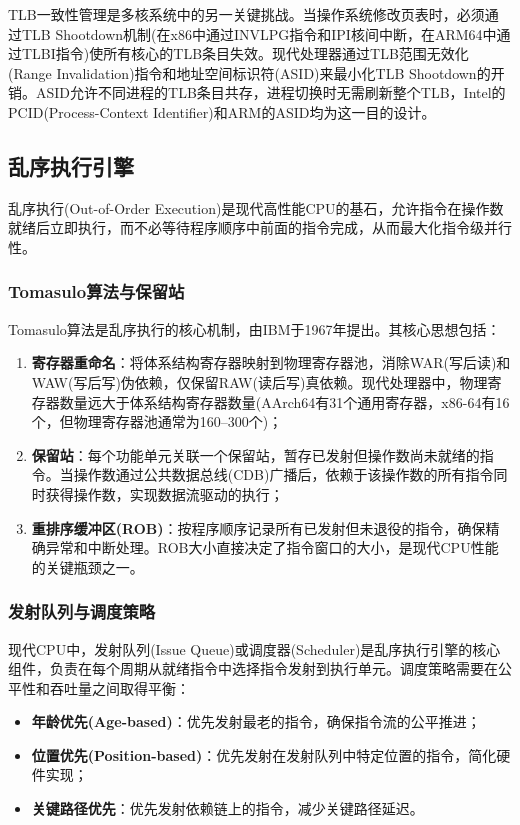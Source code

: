 \documentclass[12pt,a4paper]{IEEEtran}
\begin{document}
TLB一致性管理是多核系统中的另一关键挑战。当操作系统修改页表时，必须通过TLB Shootdown机制(在x86中通过INVLPG指令和IPI核间中断，在ARM64中通过TLBI指令)使所有核心的TLB条目失效。现代处理器通过TLB范围无效化(Range Invalidation)指令和地址空间标识符(ASID)来最小化TLB Shootdown的开销。ASID允许不同进程的TLB条目共存，进程切换时无需刷新整个TLB，Intel的PCID(Process-Context Identifier)和ARM的ASID均为这一目的设计\cite{bhattacharjee2022mmu}。

\subsection{乱序执行引擎}

乱序执行(Out-of-Order Execution)是现代高性能CPU的基石，允许指令在操作数就绪后立即执行，而不必等待程序顺序中前面的指令完成，从而最大化指令级并行性\cite{tomasulo1967algorithm}。

\subsubsection{Tomasulo算法与保留站}

Tomasulo算法是乱序执行的核心机制，由IBM于1967年提出。其核心思想包括：
\begin{enumerate}
\item \textbf{寄存器重命名}：将体系结构寄存器映射到物理寄存器池，消除WAR(写后读)和WAW(写后写)伪依赖，仅保留RAW(读后写)真依赖。现代处理器中，物理寄存器数量远大于体系结构寄存器数量(AArch64有31个通用寄存器，x86-64有16个，但物理寄存器池通常为160--300个)\cite{smith1998registerrenaming}；
\item \textbf{保留站}：每个功能单元关联一个保留站，暂存已发射但操作数尚未就绪的指令。当操作数通过公共数据总线(CDB)广播后，依赖于该操作数的所有指令同时获得操作数，实现数据流驱动的执行；
\item \textbf{重排序缓冲区(ROB)}：按程序顺序记录所有已发射但未退役的指令，确保精确异常和中断处理。ROB大小直接决定了指令窗口的大小，是现代CPU性能的关键瓶颈之一。
\end{enumerate}

\subsubsection{发射队列与调度策略}

现代CPU中，发射队列(Issue Queue)或调度器(Scheduler)是乱序执行引擎的核心组件，负责在每个周期从就绪指令中选择指令发射到执行单元。调度策略需要在公平性和吞吐量之间取得平衡：
\begin{itemize}
\item \textbf{年龄优先(Age-based)}：优先发射最老的指令，确保指令流的公平推进；
\item \textbf{位置优先(Position-based)}：优先发射在发射队列中特定位置的指令，简化硬件实现；
\item \textbf{关键路径优先}：优先发射依赖链上的指令，减少关键路径延迟。
\end{itemize}
\end{document}
